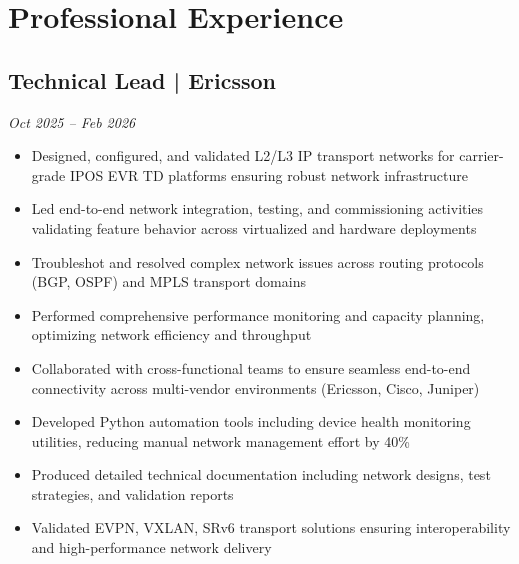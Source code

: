 \documentclass[10pt,a4paper]{article}
\begin{document}
\vspace{2pt}


\section*{Professional Experience}

\subsection*{Technical Lead | Ericsson}
\hfill \textit{Oct 2025 -- Feb 2026}
\begin{itemize}
    \item Designed, configured, and validated L2/L3 IP transport networks for carrier-grade IPOS EVR TD platforms ensuring robust network infrastructure
    \item Led end-to-end network integration, testing, and commissioning activities validating feature behavior across virtualized and hardware deployments
    \item Troubleshot and resolved complex network issues across routing protocols (BGP, OSPF) and MPLS transport domains
    \item Performed comprehensive performance monitoring and capacity planning, optimizing network efficiency and throughput
    \item Collaborated with cross-functional teams to ensure seamless end-to-end connectivity across multi-vendor environments (Ericsson, Cisco, Juniper)
    \item Developed Python automation tools including device health monitoring utilities, reducing manual network management effort by 40\%
    \item Produced detailed technical documentation including network designs, test strategies, and validation reports
    \item Validated EVPN, VXLAN, SRv6 transport solutions ensuring interoperability and high-performance network delivery
\vspace{2pt}
\end{itemize}

\vspace{2pt}
\end{document}
